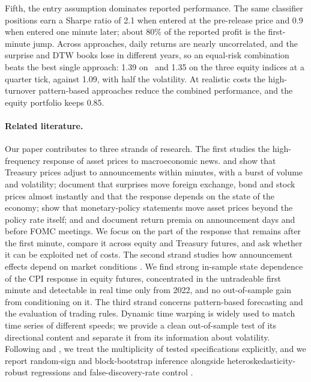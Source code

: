 Fifth, the entry assumption dominates reported performance. The same classifier positions earn a
Sharpe ratio of 2.1 when entered at the pre-release price and 0.9 when entered one minute later;
about 80\% of the reported profit is the first-minute jump. Across approaches, daily returns are
nearly uncorrelated, and the surprise and DTW books lose in different years, so an equal-risk
combination beats the best single approach: 1.39 on \ES\ and 1.35 on the three equity indices at a
quarter tick, against 1.09, with half the volatility. At realistic costs the high-turnover
pattern-based approaches reduce the combined performance, and the equity portfolio keeps 0.85.

\paragraph{Related literature.}
Our paper contributes to three strands of research. The first studies the high-frequency response
of asset prices to macroeconomic news. \citet{Fleming1999} and \citet{Balduzzi2001} show that
Treasury prices adjust to announcements within minutes, with a burst of volume and volatility;
\citet{Andersen2003, Andersen2007} document that surprises move foreign exchange, bond and stock
prices almost instantly and that the response depends on the state of the economy;
\citet{Gurkaynak2005} show that monetary-policy statements move asset prices beyond the policy
rate itself; and \citet{Savor2013} and \citet{Lucca2015} document return premia on announcement
days and before FOMC meetings. We focus on the part of the response that remains after the first
minute, compare it across equity and Treasury futures, and ask whether it can be exploited net of
costs. The second strand studies how announcement effects depend on market conditions
\citep{Andersen2007}. We find strong in-sample state dependence of the CPI response in equity
futures, concentrated in the untradeable first minute and detectable in real time only from 2022,
and no out-of-sample gain from conditioning on it. The third strand concerns pattern-based
forecasting and the evaluation of trading rules. Dynamic time warping \citep{Sakoe1978,
Berndt1994} is widely used to match time series of different speeds; we provide a clean
out-of-sample test of its directional content and separate it from its information about
volatility. Following \citet{Harvey2016} and \citet{Bailey2014}, we treat the multiplicity of
tested specifications explicitly, and we report random-sign and block-bootstrap inference
\citep{Kunsch1989} alongside heteroskedasticity-robust regressions \citep{MacKinnon1985} and
false-discovery-rate control \citep{Benjamini1995}.

